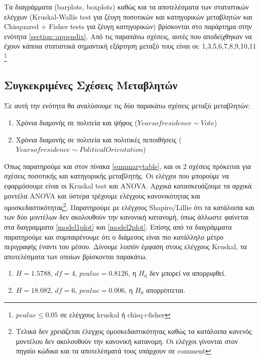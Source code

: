 \documentclass[10pt, letterpaper]{article}
\begin{document}
            \par Τα διαγράμματα (barplots, boxplots) καθώς και τα αποτελέσματα των στατιστικών ελέγχων (Kruskal-Wallis test\cite{kruskalwallis} για ζέυγη ποσοτικών και κατηγορικών μεταβλητών και Chisquared \cite{pearsonchisq} + Fisher tests\cite{fisher} για ζέυγη κατηγορικών) βρίσκονται στο παράρτημα στην ενότητα \ref{section::appendix}. Από τις παραπάνω σχέσεις, αυτές που αποδείχθηκαν να έχουν κάποια στατιστικά σημαντική εξάρτηση μεταξύ τους είναι οι: 1,3,5,6,7,8,9,10,11 \footnote{$pvalue \leq 0.05$ σε ελέγχους kruskal ή chisq+fisher}
            
        \subsection{Συγκεκριμένες Σχέσεις Μεταβλητών}
        \label{section::q2}

            \par Σε αυτή την ενότητα θα αναλὐσουμε τις δὐο παρακάτω σχέσεις μεταξύ μεταβλητὠν:
            
            \begin{enumerate}
                \item Χρόνια διαμονής σε πολιτεία και ψήφος ($Yearsofresidence \sim Vote$)
                \item Χρόνια διαμονής σε πολιτεία και πολιτικές πεποιθήσεις ($Yearsofresidence \sim PoliticalOrientation$)
            \end{enumerate}

            \par Όπως παρατηρούμε και στον πίνακα \ref{summarytable}, και οι 2 σχέσεις πρόκειται για σχέσεις ποσοτικής και κατηγορικής μεταβλητής. Οι ελέγχοι που μπορούμε να εφαρμόσουμε είναι οι Kruskal test και ANOVA. Αρχικά κατασκευάζουμε τα αρχικά μοντέλα ANOVA και ύστερα τρέχουμε ελέγχους κανονικότητας και ομοσκεδαστικότητας\footnote{Τελικά δεν χρειάζεται έλεγχος ομοσκεδαστικότητας καθώς τα κατάλοιπα κανενός μοντέλου δεν ακολουθούν την κανονική κατανομη. Οι ελέγχοι γίνονται στον πηγαίο κώδικα και τα αποτελέσματά τους υπάρχουν σε comment}. Παρατηρούμε με ελέγχους Shapiro/Lillie ότι τα κατάλοιπα και των δύο μοντέλων δεν ακολουθούν την κανονική κατανομή, όπως άλλωστε φαίνεται στα διαγραμματα \ref{model1plot} και \ref{model2plot}. Επίσης από τα διαγράμματα παρατηρούμε και συμπαιρένουμε ότι ο διάμεσος είναι πιο κατάλληλο μέτρο περιγραφής έναντι του μέσου. Δίνουμε λοιπόν έμφαση στους ελέγχους Kruskal, τα αποτελέσματα των οποίων βρίσκονται παρακάτω.
            \begin{enumerate}
                \item $H=1.5788$, $df=4$, $pvalue=0.8126$, η $H_0$ δεν μπορεί να απορριφθεί.
                \item $H=18.082$, $df=6$, $pvalue=0.006$, η $H_0$ απορρίπτεται.
            \end{enumerate}
\end{document}
